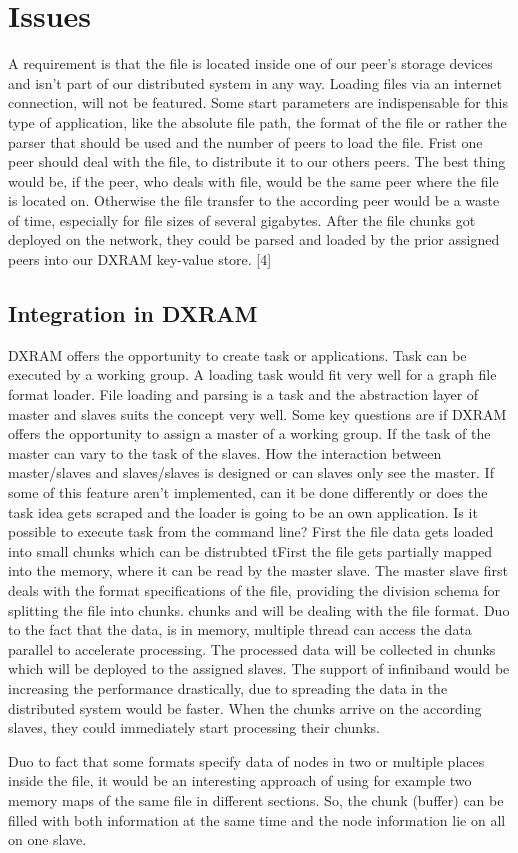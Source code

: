 \section{Issues}
A requirement is that the file is located inside one of our peer’s storage devices and isn’t part of our distributed system in any way. Loading files via an internet connection, will not be featured. Some start parameters are indispensable for this type of application, like the absolute file path, the format of the file or rather the parser that should be used and the number of peers to load the file.
Frist one peer should deal with the file, to distribute it to our others peers. The best thing would be, if the peer, who deals with file, would be the same peer where the file is located on. Otherwise the file transfer to the according peer would be a waste of time, especially for file sizes of several gigabytes. After the file chunks got deployed on the network, they could be parsed and loaded by the prior assigned peers into our DXRAM key-value store. [4]




\subsection{Integration in DXRAM}
DXRAM offers the opportunity to create task or applications. Task can be executed by a working group. A loading task would fit very well for a graph file format loader. File loading and parsing is a task and the abstraction layer of master and slaves suits the concept very well.
Some key questions are if DXRAM offers the opportunity to assign a master of a working group. If the task of the master can vary to the task of the slaves. How the interaction between master/slaves and slaves/slaves is designed or can slaves only see the master.
If some of this feature aren’t implemented, can it be done differently or does the task idea gets scraped and the loader is going to be an own application. Is it possible to execute task from the command line?
First the file data gets loaded into small chunks which can be distrubted tFirst the file gets partially mapped into the memory, where it can be read by the master slave. The master slave first deals with the format specifications of the file, providing the division schema for splitting the file into chunks. chunks and will be dealing with the file format. Duo to the fact that the data, is in memory, multiple thread can access the data parallel to accelerate processing. The processed data will be collected in chunks which will be deployed to the assigned slaves.
The support of infiniband would be increasing the performance drastically, due to spreading the data in the distributed system would be faster.
When the chunks arrive on the according slaves, they could immediately start processing their chunks.
 
Duo to fact that some formats specify data of nodes in two or multiple places inside the file, it would be an interesting approach of using for example two memory maps of the same file in different sections. So, the chunk (buffer) can be filled with both information at the same time and the node information lie on all on one slave.

